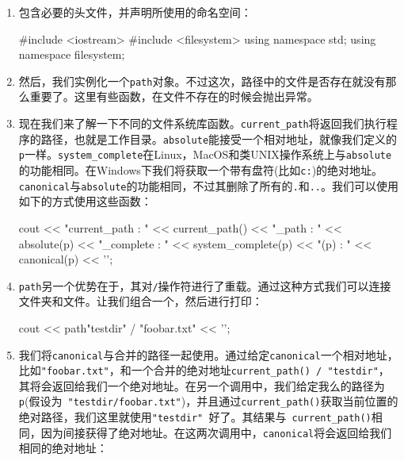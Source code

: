 \begin{enumerate}
\item 包含必要的头文件，并声明所使用的命名空间：

\begin{codebox}[cpp]
#include <iostream>
#include <filesystem>
using namespace std;
using namespace filesystem;
\end{codebox}

\item 然后，我们实例化一个\texttt{path}对象。不过这次，路径中的文件是否存在就没有那么重要了。这里有些函数，在文件不存在的时候会抛出异常。

\begin{codebox}[cpp]
int main()
{
    path p {"testdir/foobar.txt"};
\end{codebox}

\item 现在我们来了解一下不同的文件系统库函数。\texttt{current\_path}将返回我们执行程序的路径，也就是工作目录。\texttt{absolute}能接受一个相对地址，就像我们定义的\texttt{p}一样。\texttt{system\_complete}在Linux，MacOS和类UNIX操作系统上与\texttt{absolute}的功能相同。在Windows下我们将获取一个带有盘符(比如\texttt{c:})的绝对地址。\texttt{canonical}与\texttt{absolute}的功能相同，不过其删除了所有的\texttt{.}和\texttt{..}。我们可以使用如下的方式使用这些函数：

\begin{codebox}[cpp]
cout << "current_path : " << current_path()
     << "\nabsolute_path : " << absolute(p)
     << "\nsystem_complete : " << system_complete(p)
     << "\ncanonical(p) : " << canonical(p)
     << '\n';
\end{codebox}

\item \texttt{path}另一个优势在于，其对\texttt{/}操作符进行了重载。通过这种方式我们可以连接文件夹和文件。让我们组合一个，然后进行打印：

\begin{codebox}[cpp]
    cout << path{"testdir"} / "foobar.txt" << '\n';
\end{codebox}

\item 我们将\texttt{canonical}与合并的路径一起使用。通过给定\texttt{canonical}一个相对地址，比如\texttt{"foobar.txt"}，和一个合并的绝对地址\texttt{current\_path() / "testdir"}，其将会返回给我们一个绝对地址。在另一个调用中，我们给定我么的路径为\texttt{p}(假设为\texttt{ "testdir/foobar.txt"})，并且通过\texttt{current\_path()}获取当前位置的绝对路径，我们这里就使用\texttt{"testdir" }好了。其结果与\texttt{ current\_path()}相同，因为间接获得了绝对地址。在这两次调用中，\texttt{canonical}将会返回给我们相同的绝对地址：


\end{enumerate}
